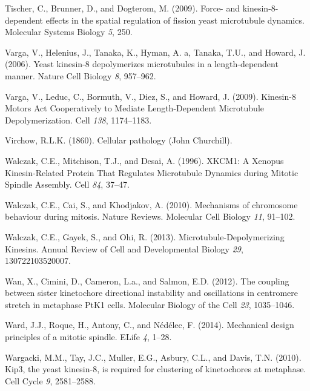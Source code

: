 \documentclass[12pt,a4paper,twoside,openright]{book}
\begin{document}
Tischer, C., Brunner, D., and Dogterom, M. (2009). Force- and
kinesin-8-dependent effects in the spatial regulation of fission yeast
microtubule dynamics. Molecular Systems Biology \emph{5}, 250.

Varga, V., Helenius, J., Tanaka, K., Hyman, A. a, Tanaka, T.U., and
Howard, J. (2006). Yeast kinesin-8 depolymerizes microtubules in a
length-dependent manner. Nature Cell Biology \emph{8}, 957--962.

Varga, V., Leduc, C., Bormuth, V., Diez, S., and Howard, J. (2009).
Kinesin-8 Motors Act Cooperatively to Mediate Length-Dependent
Microtubule Depolymerization. Cell \emph{138}, 1174--1183.

Virchow, R.L.K. (1860). Cellular pathology (John Churchill).

Walczak, C.E., Mitchison, T.J., and Desai, A. (1996). XKCM1: A Xenopus
Kinesin-Related Protein That Regulates Microtubule Dynamics during
Mitotic Spindle Assembly. Cell \emph{84}, 37--47.

Walczak, C.E., Cai, S., and Khodjakov, A. (2010). Mechanisms of
chromosome behaviour during mitosis. Nature Reviews. Molecular Cell
Biology \emph{11}, 91--102.

Walczak, C.E., Gayek, S., and Ohi, R. (2013). Microtubule-Depolymerizing
Kinesins. Annual Review of Cell and Developmental Biology \emph{29},
130722103520007.

Wan, X., Cimini, D., Cameron, L.a., and Salmon, E.D. (2012). The
coupling between sister kinetochore directional instability and
oscillations in centromere stretch in metaphase PtK1 cells. Molecular
Biology of the Cell \emph{23}, 1035--1046.

Ward, J.J., Roque, H., Antony, C., and Nédélec, F. (2014). Mechanical
design principles of a mitotic spindle. ELife \emph{4}, 1--28.

Wargacki, M.M., Tay, J.C., Muller, E.G., Asbury, C.L., and Davis, T.N.
(2010). Kip3, the yeast kinesin-8, is required for clustering of
kinetochores at metaphase. Cell Cycle \emph{9}, 2581--2588.
\end{document}
